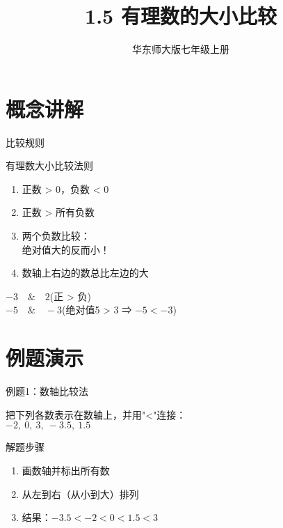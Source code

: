 \documentclass{ctexbeamer}
\title{1.5 有理数的大小比较}
\author{华东师大版七年级上册}
\date{}
\begin{document}
\begin{frame}
    \titlepage
\end{frame}

\section{概念讲解}
\begin{frame}{比较规则}
    \begin{block}{有理数大小比较法则}
        \begin{enumerate}
            \item 正数 \alert{>} 0，负数 \alert{<} 0
            \item 正数 \alert{>} 所有负数
            \item 两个负数比较：\\绝对值大的反而\alert{小}！
            \item 数轴上右边的数总比左边的\alert{大}
        \end{enumerate}
    \end{block}
    
    \begin{example}
        $-3 \quad \& \quad 2$\quad (正 > 负)\\
        $-5 \quad \& \quad -3$\quad (绝对值5 > 3 ⇒ $-5 < -3$)
    \end{example}
\end{frame}

\section{例题演示}
\begin{frame}{例题1：数轴比较法}
    \begin{example}
        把下列各数表示在数轴上，并用"<"连接：\\
        $-2,\ 0,\ 3,\ -3.5,\ 1.5$
    \end{example}
    
    \pause
    \begin{block}{解题步骤}
        \begin{enumerate}
            \item 画数轴并标出所有数
            \item 从左到右（从小到大）排列
            \item 结果：$-3.5 < -2 < 0 < 1.5 < 3$
        \end{enumerate}
    \end{block}
\end{frame}
\end{document}
